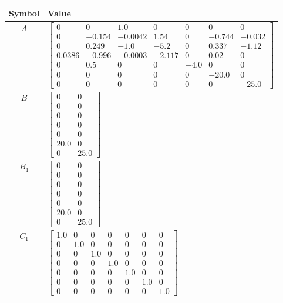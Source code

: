 \begin{tabular}{cl}
\hline
  Symbol  & Value                                                                                                                                                                                                                                                                                                                 \\
\hline
   $A$    & $\left[\begin{matrix}0 & 0 & 1.0 & 0 & 0 & 0 & 0\\0 & -0.154 & -0.0042 & 1.54 & 0 & -0.744 & -0.032\\0 & 0.249 & -1.0 & -5.2 & 0 & 0.337 & -1.12\\0.0386 & -0.996 & -0.0003 & -2.117 & 0 & 0.02 & 0\\0 & 0.5 & 0 & 0 & -4.0 & 0 & 0\\0 & 0 & 0 & 0 & 0 & -20.0 & 0\\0 & 0 & 0 & 0 & 0 & 0 & -25.0\end{matrix}\right]$ \\
   $B$    & $\left[\begin{matrix}0 & 0\\0 & 0\\0 & 0\\0 & 0\\0 & 0\\20.0 & 0\\0 & 25.0\end{matrix}\right]$                                                                                                                                                                                                                        \\
 $B_{1}$  & $\left[\begin{matrix}0 & 0\\0 & 0\\0 & 0\\0 & 0\\0 & 0\\20.0 & 0\\0 & 25.0\end{matrix}\right]$                                                                                                                                                                                                                        \\
 $C_{1}$  & $\left[\begin{matrix}1.0 & 0 & 0 & 0 & 0 & 0 & 0\\0 & 1.0 & 0 & 0 & 0 & 0 & 0\\0 & 0 & 1.0 & 0 & 0 & 0 & 0\\0 & 0 & 0 & 1.0 & 0 & 0 & 0\\0 & 0 & 0 & 0 & 1.0 & 0 & 0\\0 & 0 & 0 & 0 & 0 & 1.0 & 0\\0 & 0 & 0 & 0 & 0 & 0 & 1.0\end{matrix}\right]$                                                                    \\

\end{tabular}
